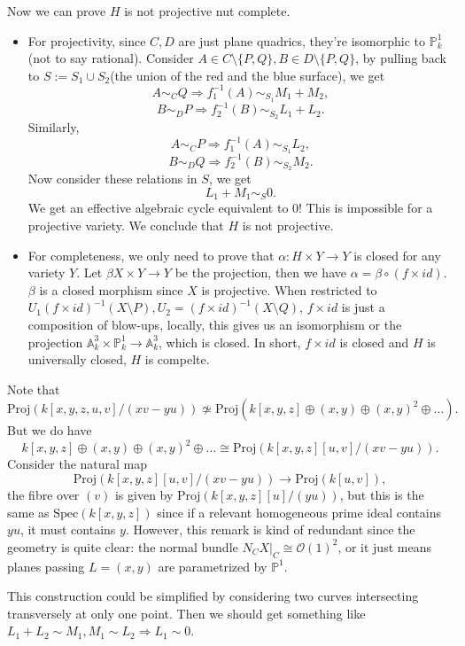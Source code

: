 \documentclass[../main.tex]{subfiles}
\begin{document}
\begin{example}
Now we can prove $H$ is not projective nut complete. 
\begin{itemize}
\item For projectivity, since $C,D$ are just plane quadrics, they're isomorphic to $\mathbb{P}_{k}^{1}$(not to say rational). Consider $A\in C\setminus\{P,Q\}, B\in D\setminus\{P,Q\}$, by pulling back to $S:=S_{1}\cup S_{2}$(the union of the red and the blue surface), we get 
$$A\sim_{C} Q\Rightarrow f_{1}^{-1}(A)\sim_{S_{1}} M_{1}+M_{2},$$
$$B\sim_{D} P\Rightarrow f_{2}^{-1}(B)\sim_{S_{2}} L_{1}+L_{2}.$$
Similarly,
$$A\sim_{C} P\Rightarrow f_{1}^{-1}(A)\sim_{S_{1}} L_{2},$$
$$B\sim_{D} Q\Rightarrow f_{2}^{-1}(B)\sim_{S_{2}} M_{2}.$$
Now consider these relations in $S$, we get 
$$L_{1}+M_{1}\sim_{S} 0.$$
We get an effective algebraic cycle equivalent to $0$! This is impossible for a projective variety. We conclude that $H$ is not projective.
\item For completeness, we only need to prove that $\alpha: H\times Y\rightarrow Y$ is closed for any variety $Y$. Let $\beta X\times Y\rightarrow Y$ be the projection, then we have $\alpha=\beta\circ (f\times id).$ $\beta$ is a closed morphism since $X$ is projective. When restricted to $U_{1}(f\times id)^{-1}(X\setminus P), U_{2}=(f\times id)^{-1}(X\setminus Q)$, $f\times id$ is just a composition of blow-ups, locally, this gives us an isomorphism or the projection $\mathbb{A}_{k}^{3}\times \mathbb{P}_{k}^{1}\rightarrow \mathbb{A}_{k}^{3}$, which is closed. In short, $f\times id$ is closed and $H$ is universally closed, $H$ is compelte. 
\end{itemize}








\end{example}

\begin{remark}
Note that $$\mathrm{Proj}(k[x,y,z,u,v]/(xv-yu))\not\simeq\mathrm{Proj}(k[x,y,z]\oplus (x,y)\oplus(x,y)^{2}\oplus \dots ).$$
But we do have 
$$k[x,y,z]\oplus (x,y)\oplus(x,y)^{2}\oplus \dots \cong \mathrm{Proj}(k[x,y,z][u,v]/(xv-yu)).$$
Consider the natural map 
$$\mathrm{Proj}(k[x,y,z][u,v]/(xv-yu))\rightarrow \mathrm{Proj}(k[u,v]),$$
the fibre over $(v)$ is given by $\mathrm{Proj}(k[x,y,z][u]/(yu))$, but this is the same as $\mathrm{Spec}(k[x,y,z])$ since if a relevant homogeneous prime ideal contains $yu$, it must contains $y$. However, this remark is kind of redundant since the geometry is quite clear: the normal bundle $N_{C}X|_{C}\cong \mathcal{O}(1)^{2}$, or it just means planes passing $L=(x,y)$ are parametrized by $\mathbb{P}^{1}.$ 
\end{remark}
\begin{remark}
This construction could be simplified by considering two curves intersecting transversely at only one point. Then we should get something like $L_{1}+L_{2}\sim M_{1}, M_{1}\sim L_{2}\Rightarrow L_{1}\sim 0.$
\end{remark}
\end{document}
